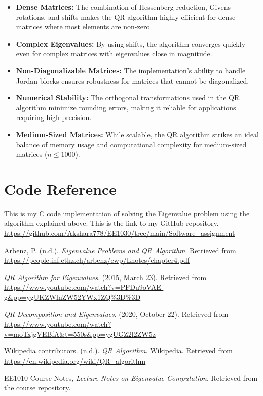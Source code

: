\documentclass[12pt]{article}
\begin{document}
\begin{itemize}
    \item \textbf{Dense Matrices:} The combination of Hessenberg reduction, Givens rotations, and shifts makes the QR algorithm highly efficient for dense matrices where most elements are non-zero.  
    \item \textbf{Complex Eigenvalues:} By using shifts, the algorithm converges quickly even for complex matrices with eigenvalues close in magnitude.  
    \item \textbf{Non-Diagonalizable Matrices:} The implementation's ability to handle Jordan blocks ensures robustness for matrices that cannot be diagonalized.  
    \item \textbf{Numerical Stability:} The orthogonal transformations used in the QR algorithm minimize rounding errors, making it reliable for applications requiring high precision.  
    \item \textbf{Medium-Sized Matrices:} While scalable, the QR algorithm strikes an ideal balance of memory usage and computational complexity for medium-sized matrices (\(n \leq 1000\)).  
\end{itemize}

\section{Code Reference}
This is my C code implementation of solving the Eigenvalue problem using the algorithm explained above. This is the link to my GitHub repository.\\
\url{https://github.com/Akshara778/EE1030/tree/main/Software_assignment}

\begin{thebibliography}{99}

 Arbenz, P. (n.d.). \textit{Eigenvalue Problems and QR Algorithm}. Retrieved from \url{https://people.inf.ethz.ch/arbenz/ewp/Lnotes/chapter4.pdf}

 \textit{QR Algorithm for Eigenvalues}. (2015, March 23). Retrieved from \url{https://www.youtube.com/watch?v=PFDu9oVAE-g&pp=ygUKZWlnZW52YWx1ZQ%3D%3D}

 \textit{QR Decomposition and Eigenvalues}. (2020, October 22). Retrieved from \url{https://www.youtube.com/watch?v=moTxjgVEBfA&t=550s&pp=ygUGZ2l2ZW5z}

 Wikipedia contributors. (n.d.). \textit{QR Algorithm}. Wikipedia. Retrieved from \url{https://en.wikipedia.org/wiki/QR_algorithm}

 EE1010 Course Notes, \textit{Lecture Notes on Eigenvalue Computation}, Retrieved from the course repository.

\end{thebibliography}
\end{document}
